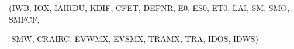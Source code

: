 \begin{indenting}{3.81cm}
(IWB, IOX, IAIRDU, KDIF, CFET, DEPNR, E0, ES0, ET0, LAI, SM, SMO, SMFCF,
\end{indenting}
\begin{tabbing}
\hspace{1.27cm}\=\hspace{1.27cm}\=\hspace{1.27cm}\=\hspace{1.27cm}\=%
\hspace{1.27cm}\=\hspace{1.27cm}\=\hspace{1.27cm}\=\hspace{1.27cm}\=%
\hspace{1.27cm}\=\hspace{1.27cm}\=\kill
 \>\> \>  SMW, CRAIRC, EVWMX, EVSMX, TRAMX, TRA, IDOS, IDWS)
\end{tabbing}
\nwln

